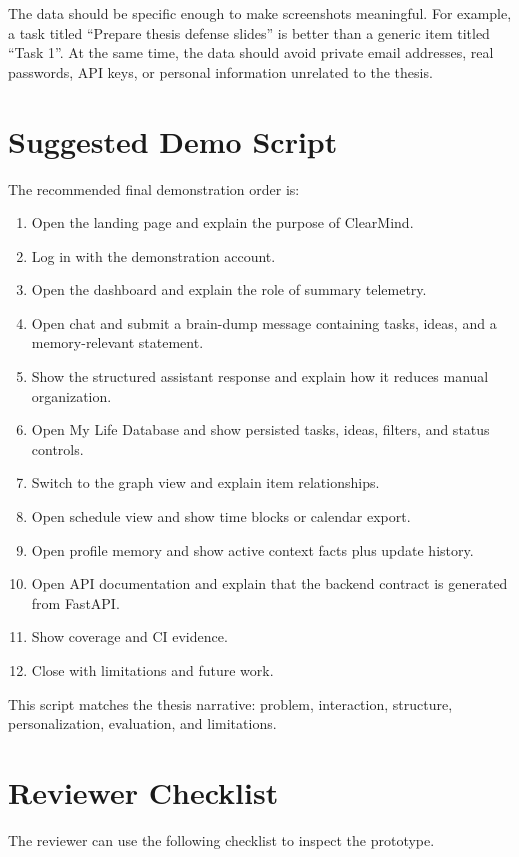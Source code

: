 The data should be specific enough to make screenshots meaningful. For example, a task titled ``Prepare thesis defense slides'' is better than a generic item titled ``Task 1''. At the same time, the data should avoid private email addresses, real passwords, API keys, or personal information unrelated to the thesis.

\section{Suggested Demo Script}

The recommended final demonstration order is:

\begin{enumerate}
  \item Open the landing page and explain the purpose of ClearMind.
  \item Log in with the demonstration account.
  \item Open the dashboard and explain the role of summary telemetry.
  \item Open chat and submit a brain-dump message containing tasks, ideas, and a memory-relevant statement.
  \item Show the structured assistant response and explain how it reduces manual organization.
  \item Open My Life Database and show persisted tasks, ideas, filters, and status controls.
  \item Switch to the graph view and explain item relationships.
  \item Open schedule view and show time blocks or calendar export.
  \item Open profile memory and show active context facts plus update history.
  \item Open API documentation and explain that the backend contract is generated from FastAPI.
  \item Show coverage and CI evidence.
  \item Close with limitations and future work.
\end{enumerate}

This script matches the thesis narrative: problem, interaction, structure, personalization, evaluation, and limitations.

\section{Reviewer Checklist}

The reviewer can use the following checklist to inspect the prototype.

